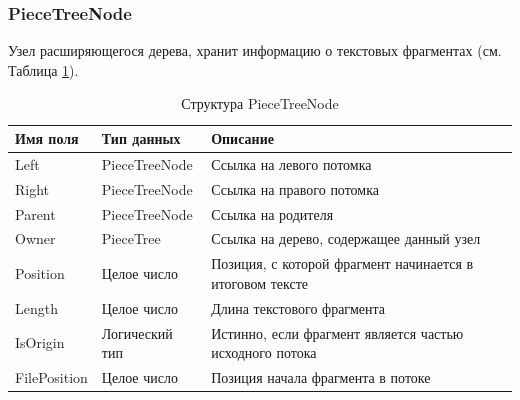 \documentclass{fefu}
\begin{document}
			\subsubsection{PieceTreeNode}
				\par Узел расширяющегося дерева, хранит информацию о 
				текстовых фрагментах (см. Таблица \ref{table:PieceTreeNode}).
				\begin{table}[h]
					\centering
					\begin{tabular}{|l|l|p{10cm}|}
						\hline
						\textbf{Имя поля} & \textbf{Тип данных} & \textbf{Описание} \\
						\hline
						Left & PieceTreeNode & Ссылка на левого потомка\\
						\hline
						Right & PieceTreeNode & Ссылка на правого потомка \\
						\hline
						Parent & PieceTreeNode & Ссылка на родителя \\
						\hline
						Owner & PieceTree & Ссылка на дерево, содержащее данный узел \\
						\hline
						Position & Целое число & Позиция, с которой фрагмент начинается в 
						итоговом тексте \\
						\hline
						Length & Целое число & Длина текстового фрагмента \\
						\hline
						IsOrigin & Логический тип & Истинно, если фрагмент является частью 
						исходного потока \\
						\hline
						FilePosition & Целое число & Позиция начала фрагмента в потоке \\
						\hline
					\end{tabular}
					\caption{Структура PieceTreeNode}
					\label{table:PieceTreeNode}
				\end{table}
\end{document}
